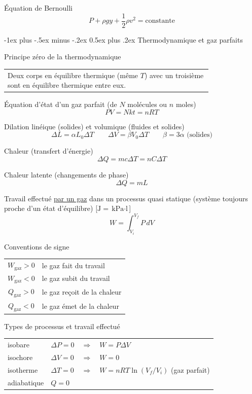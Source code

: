 \documentclass[10pt,landscape]{article}
\makeatletter
\renewcommand{\section}{\@startsection{section}{1}{0mm}%
                                {-1ex plus -.5ex minus -.2ex}%
                                {0.5ex plus .2ex}%
                                {\normalfont\large\bfseries}}
\newcommand{\halfline}{\vspace{0.5em}}
\newcommand{\tableindent}{\hspace{1.5em}}
\makeatother
\begin{document}
\begin{multicols}{3}
Équation de Bernoulli
\[ P + \rho g y + \frac{1}{2}\rho v^2 = \text{constante} \]

\hrulefill


\section{Thermodynamique et gaz parfaits}

Principe zéro de la thermodynamique \\
\halfline
\begin{tabular}{@{\tableindent}p{0.8\linewidth}}
	Deux corps en équilibre thermique (même $T$) avec un troisième sont en équilibre thermique entre eux. \\
\end{tabular}
\halfline
	
Équation d'état d'un gaz parfait (de $N$ molécules ou $n$ moles)
\[ PV = Nkt = nRT \]

Dilation linéique (solides) et volumique (fluides et solides)
\[ \Delta L = \alpha L_0 \Delta T 
\qquad 
\Delta V = \beta V_0 \Delta T  \qquad  \beta = 3\alpha \text{ (solides)}
\]

Chaleur (transfert d'énergie)
\[ \Delta Q = mc\Delta T = nC\Delta T \]

Chaleur latente (changements de phase)
\[ \Delta Q = mL \]

Travail effectué \underline{par un gaz} dans un processus quasi statique (système toujours proche d'un état d'équilibre) [$\si{\joule} = \si{\kilo\pascal\cdot\litre}$]
\[ W = \int_{V_i}^{V_f} P\, dV \]

Conventions de signe \\
\begin{tabular}{@{\tableindent}cl}
	$W_\text{gaz} > 0$ & le gaz fait du travail \\
	$W_\text{gaz} < 0$ & le gaz subit du travail \\
	$Q_\text{gaz} > 0$ & le gaz reçoit de la chaleur \\
	$Q_\text{gaz} < 0$ & le gaz émet de la chaleur \\
\end{tabular}
\halfline

Types de processus et travail effectué \\
\begin{tabular}{@{\tableindent}llcp{33mm}<{\raggedright}}
	isobare & $\Delta P=0$  & $ \Longrightarrow$ & $W=P\Delta V$  \\
	isochore & $\Delta V=0$  & $\Longrightarrow$ & $W=0$ \\
	isotherme & $\Delta T=0$ & $\Longrightarrow$& $W=nRT\ln(V_f/V_i)$ \scriptsize{(gaz parfait)}\\
	adiabatique & $Q=0$ & & \\
\end{tabular}
\halfline


\end{multicols}
\end{document}
